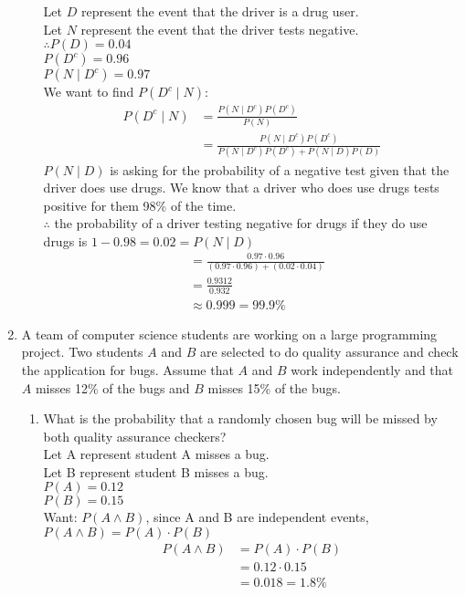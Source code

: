\documentclass{article}
\begin{document}
\begin{enumerate}
\begin{enumerate}
Let $D$ represent the event that the driver is a drug user.\\
Let $N$ represent the event that the driver tests negative.\\
$\therefore P(D) = 0.04$ \\
$P(D^c) = 0.96$\\
$P(N \mid D^c) = 0.97$\\
We want to find $P(D^c \mid N)$:
\begin {align}
P(D^c \mid N) &= \frac{P(N \mid D^c)P(D^c)}{P(N)}\\
&= \frac{P(N \mid D^c)P(D^c)}{P(N\mid D^c)P(D^c) + P(N \mid D)P(D)}
\end {align}
$P(N \mid D)$ is asking for the probability of a negative test given that the driver does use drugs. We know that a driver who does use drugs tests positive for them 98\% of the time.\\
$\therefore$ the probability of a driver testing negative for drugs if they do use drugs is $1 - 0.98 = 0.02 = P(N \mid D)$\\
\begin {align}
&= \frac{0.97 \cdot 0.96}{(0.97 \cdot 0.96) + (0.02 \cdot 0.04)}\\
&= \frac{0.9312}{0.932}\\
&\approx 0.999 = 99.9\%
\end {align}
\end{enumerate}

\item A team of computer science students are working on a large programming project. Two students $A$ and $B$ are selected to do quality assurance and check the application for bugs. Assume that $A$ and $B$ work independently and that $A$ misses 12\% of the bugs and $B$ misses 15\% of the bugs.  
\begin{enumerate}
\item What is the probability that a randomly chosen bug will be missed by both quality assurance checkers?\\

Let A represent student A misses a bug.\\
Let B represent student B misses a bug.\\
$P(A) = 0.12$\\
$P(B) = 0.15$\\
Want: $P(A \land B)$, since A and B are independent events, $P(A \land  B) = P(A) \cdot P(B)$\\
\begin {align}
P(A \land B) &= P(A) \cdot P(B)\\
&= 0.12 \cdot 0.15\\
&= 0.018 = 1.8\%
\end {align}


\end{enumerate}
\end{enumerate}
\end{document}
